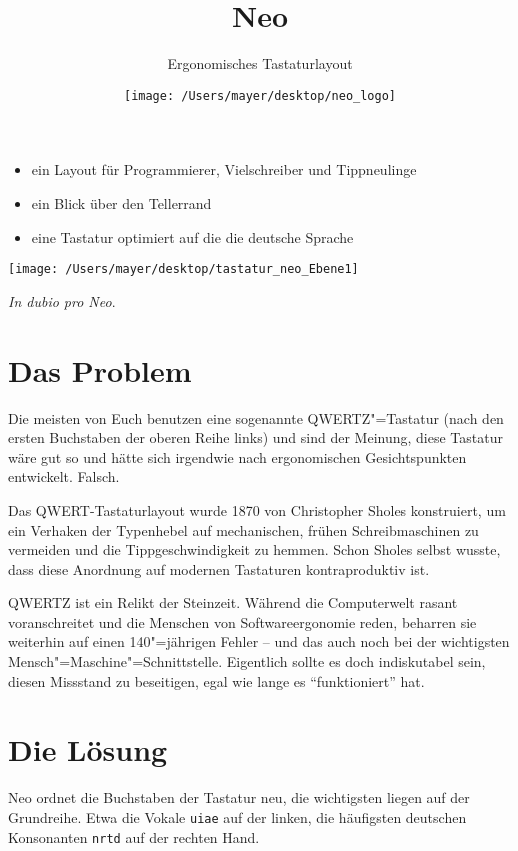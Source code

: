 \documentclass[%
  a4paper
  ,ngerman
  ,notumble
]{leaflet}
\title{Neo}
\author{Ergonomisches Tastaturlayout}
\date{\texttt{[image: /Users/mayer/desktop/neo\_logo]}}
\begin{document}
\maketitle
\begin{itemize}%
\item ein Layout für Programmierer, Vielschreiber und Tippneulinge
\item ein Blick über den Tellerrand
\item eine Tastatur optimiert auf die die deutsche Sprache
\end{itemize}%

\vfill

\texttt{[image: /Users/mayer/desktop/tastatur\_neo\_Ebene1]}

\vfill

\begin{center}
\emph{In dubio pro Neo}.
\end{center}
\newpage
\section{Das Problem}

Die meisten von Euch benutzen eine sogenannte QWERTZ"=Tastatur (nach den ersten Buchstaben der oberen Reihe links) und sind der Meinung, diese Tastatur wäre gut so und hätte sich irgendwie nach ergonomischen Gesichtspunkten entwickelt. Falsch.

Das QWERT-Tastaturlayout wurde 1870 von Christopher Sholes konstruiert, um ein Verhaken der Typenhebel auf mechanischen, frühen Schreibmaschinen zu vermeiden und die Tippgeschwindigkeit zu hemmen. Schon Sholes selbst wusste, dass diese Anordnung auf modernen Tastaturen kontraproduktiv ist.

QWERTZ ist ein Relikt der Steinzeit. Während die Computerwelt rasant voranschreitet und die Menschen von Softwareergonomie reden, beharren sie weiterhin auf einen 140"=jährigen Fehler -- und das auch noch bei der wichtigsten Mensch"=Maschine"=Schnittstelle. Eigentlich sollte es doch indiskutabel sein, diesen Missstand zu beseitigen, egal wie lange es \enquote{funktioniert} hat.

\section{Die Lösung}
Neo ordnet die Buchstaben der Tastatur neu, die wichtigsten liegen auf der Grundreihe. Etwa die Vokale \texttt{uiae} auf der linken, die
häufigsten deutschen Konsonanten \texttt{nrtd} auf der rechten Hand.
\end{document}
